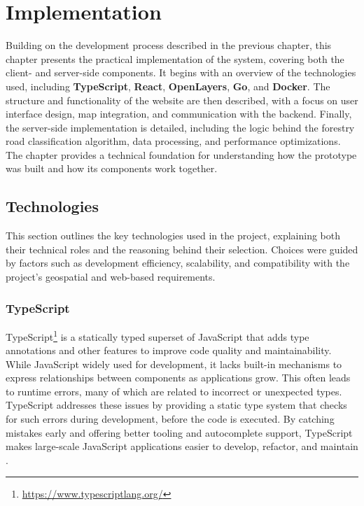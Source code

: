 \chapter{Implementation}\label{chap:implementation}

Building on the development process described in the previous chapter, this chapter presents the practical implementation of the system, covering both the client- and server-side components. It begins with an overview of the technologies used, including \textbf{TypeScript}, \textbf{React}, \textbf{OpenLayers}, \textbf{Go}, and \textbf{Docker}. The structure and functionality of the website are then described, with a focus on user interface design, map integration, and communication with the backend. Finally, the server-side implementation is detailed, including the logic behind the forestry road classification algorithm, data processing, and performance optimizations. The chapter provides a technical foundation for understanding how the prototype was built and how its components work together.


\section{Technologies}

This section outlines the key technologies used in the project, explaining both their technical roles and the reasoning behind their selection. Choices were guided by factors such as development efficiency, scalability, and compatibility with the project's geospatial and web-based requirements.

\subsection{TypeScript}

TypeScript\footnote{\url{https://www.typescriptlang.org/}} is a statically typed superset of JavaScript that adds type annotations and other features to improve code quality and maintainability. While JavaScript widely used for development, it lacks built-in mechanisms to express relationships between components as applications grow. This often leads to runtime errors, many of which are related to incorrect or unexpected types. TypeScript addresses these issues by providing a static type system that checks for such errors during development, before the code is executed. By catching mistakes early and offering better tooling and autocomplete support, TypeScript makes large-scale JavaScript applications easier to develop, refactor, and maintain \cite{typescript_handbook}. 

